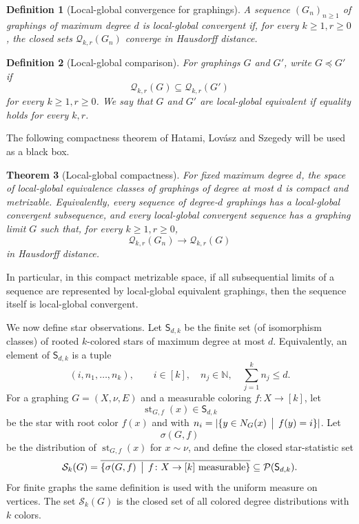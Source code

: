 \documentclass[11pt]{amsart}
\newcommand{\N}{\mathbb N}
\newcommand{\calP}{\mathcal P}
\newcommand{\calQ}{\mathcal Q}
\newcommand{\calS}{\mathcal S}
\newtheorem{theorem}{Theorem}[section]
\newtheorem{definition}[theorem]{Definition}
\theoremstyle{remark}
\begin{document}
\begin{definition}[Local-global convergence for graphings]
A sequence $(G_n)_{n\geq 1}$ of graphings of maximum degree $d$ is \emph{local-global convergent} if, for every $k\geq 1,r\geq 0$, the closed sets $\calQ_{k,r}(G_n)$ converge in Hausdorff distance.
\end{definition}

\begin{definition}[Local-global comparison]
For graphings $G$ and $G'$, write $G\preceq G'$ if
\[
 \calQ_{k,r}(G)\subseteq \calQ_{k,r}(G')
\]
for every $k\geq 1,r\geq 0$.  We say that $G$ and $G'$ are \emph{local-global equivalent} if equality holds for every $k,r$.
\end{definition}

The following compactness theorem of Hatami, Lov\'asz and Szegedy \cite{HLSz} will be used as a black box.

\begin{theorem}[Local-global compactness]\label{thm:HLS}
For fixed maximum degree $d$, the space of local-global equivalence classes of graphings of degree at most $d$ is compact and metrizable.  Equivalently, every sequence of degree-$d$ graphings has a local-global convergent subsequence, and every local-global convergent sequence has a graphing limit $G$ such that, for every $k\geq 1,r\geq 0$,
\[
 \calQ_{k,r}(G_n) \longrightarrow \calQ_{k,r}(G)
\]
in Hausdorff distance.
\end{theorem}

In particular, in this compact metrizable space, if all subsequential limits of a sequence are represented by local-global equivalent graphings, then the sequence itself is local-global convergent.

We now define star observations. Let $\mathsf S_{d,k}$ be the finite set (of isomorphism classes) of rooted $k$-colored stars of maximum degree at most $d$. Equivalently, an element of $\mathsf S_{d,k}$ is a tuple
\[
 (i,n_1,\ldots,n_k),\qquad i\in[k],\quad n_j\in\N,\quad \sum_{j=1}^k n_j\leq d.
\]
For a graphing $G=(X,\nu,E)$ and a measurable coloring $f\colon X\to[k]$, let
\[
 \operatorname{st}_{G,f}(x)\in\mathsf S_{d,k}
\]
be the star with root color $f(x)$ and with $n_i=|\{y\in N_G(x)\,\bigm|\,f(y)=i\}|$.  Let
\[
 \sigma(G,f)
\]
be the distribution of $\operatorname{st}_{G,f}(x)$ for $x\sim\nu$, and define the closed star-statistic set
\[
 \calS_k(G)=\overline{\{\sigma(G,f)\,\bigm|\,f\colon X\to[k]\text{ measurable}\}}
 \subseteq \calP(\mathsf S_{d,k}).
\]
For finite graphs the same definition is used with the uniform measure on vertices.  The set $\calS_k(G)$ is the closed set of all colored degree distributions with $k$ colors.
\end{document}
